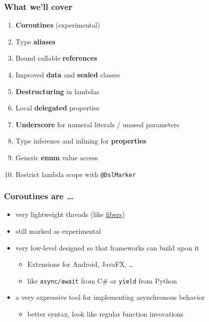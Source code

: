 


\begin{frame}\frametitle{What we'll cover}
  \begin{enumerate}[<+->]
  	\item \textbf{Coroutines} (experimental)
	\item Type \textbf{aliases}
	\item Bound callable \textbf{references}
	\item Improved \textbf{data} and \textbf{sealed} classes
	\item \textbf{Destructuring} in lambdas
	\item Local \textbf{delegated} properties
	\item \textbf{Underscore} for numeral literals / unused parameters %
	\item Type inference and inlining for \textbf{properties} %
	\item Generic \textbf{enum} value access
	\item Restrict lambda scope with \texttt{@DslMarker}
  \end{enumerate}
\end{frame}




\begin{frame}[fragile] \frametitle{Coroutines are \ldots}
\begin{itemize}
	\item very lightweight threads (like \href{https://en.wikipedia.org/wiki/Fiber_(computer_science)}{fibers})
	\item still marked as experimental
	\item very low-level designed so that frameworks can build upon it
	\begin{itemize}
		\item Extensions for Android, JavaFX, \ldots
		\item like \texttt{async/await} from C\# or \texttt{yield} from Python
	\end{itemize}
	\item a very expressive tool for implementing asynchronous behavior
	\begin{itemize}
		\item better syntax, look like regular function invocations
	\end{itemize}
\end{itemize}
\end{frame}

